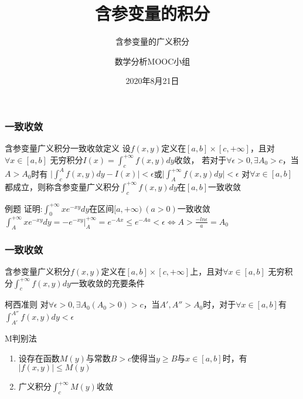 \documentclass[xetex]{beamer}
\title{含参变量的积分}
\subtitle{含参变量的广义积分}
\author{数学分析MOOC小组}
\date{2020年8月21日}
\begin{document}
\frame{\maketitle}

\begin{frame}
    \frametitle{一致收敛}
    \begin{block}{含参变量广义积分一致收敛定义}
        设$f(x,y)$定义在$[a,b]\times[c,+\infty]$，且对$\forall x\in[a,b]$
        无穷积分$I(x)=\int_{c}^{+\infty}{f(x,y)dy}$收敛，
        若对于$\forall \epsilon > 0, \exists A_0 > c$，当$A>A_0$时有
        $\vert \int_c^A{f(x,y)dy}-I(x)\vert < \epsilon$或$\vert \int_A^{+\infty}{f(x,y)dy}\vert < \epsilon$
        对$\forall x \in [a,b]$都成立，则称含参变量广义积分$\int_c^{+\infty}{f(x,y)dy}$在$[a,b]$一致收敛
    \end{block}

    \begin{block}{例题}
        证明:$\int_{0}^{+\infty}{xe^{-xy}dy}$在区间$[a,+\infty)\ (a>0)$一致收敛
        $\int_{A}^{+\infty}{xe^{-xy}dy}=-e^{-xy}|^{+\infty}_{A}=e^{-Ax}\le e^{-Aa}<\epsilon \Leftrightarrow A > \frac{-ln{\epsilon}}{a} = A_0$
    \end{block}


\end{frame}

\begin{frame}
    \frametitle{一致收敛}
    含参变量广义积分$f(x,y)$定义在$[a,b]\times[c,+\infty]$上，且对$\forall x\in[a,b]$
    无穷积分$\int_{c}^{+\infty}{f(x,y)dy}$一致收敛的充要条件
    \begin{block}{柯西准则}
        对$\forall \epsilon>0,\exists A_0(A_0>0)>c$，当$A',A''>A_0$时，对于$\forall x \in [a,b]$有
        $\int_{A'}^{A''}{f(x,y)dy}<\epsilon$
    \end{block}
    \begin{block}{M判别法}
    \begin{enumerate}
        \item 设存在函数$M(y)$与常数$B>c$使得当$y\ge B$与$x\in [a,b]$时，有$\vert f(x,y)\vert\le M(y)$
        \item 广义积分$\int_{c}^{+\infty}{M(y)}$收敛
    \end{enumerate}
    \end{block}

\end{frame}
\end{document}

